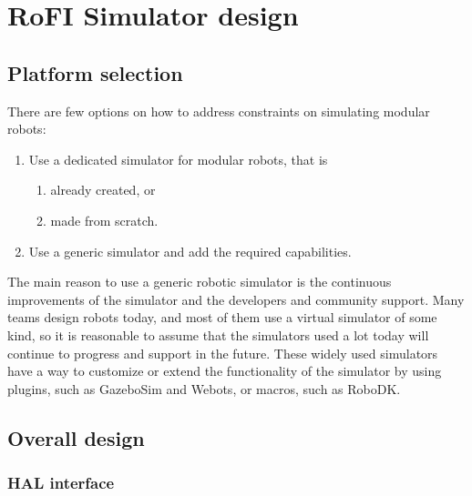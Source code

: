 \documentclass[
  digital, %
  table,   %
  oneside, %
  nolof,     %
  nolot,     %
]{fithesis3}
\begin{document}
\chapter{RoFI Simulator design}

\section{Platform selection}

There are few options on how to address constraints on simulating modular robots:
\begin{enumerate}
    \item Use a dedicated simulator for modular robots, that is
    \begin{enumerate}
        \item already created, or
        \item made from scratch.
    \end{enumerate}
    \item Use a generic simulator and add the required capabilities.
\end{enumerate}

The main reason to use a generic robotic simulator is the continuous improvements of the simulator and the developers and community support.
Many teams design robots today, and most of them use a virtual simulator of some kind, so it is reasonable to assume that the simulators used a lot today will continue to progress and support in the future.
These widely used simulators have a way to customize or extend the functionality of the simulator by using plugins, such as GazeboSim\cite{gazebo} and Webots\cite{webots}, or macros, such as RoboDK\cite{robodk}.


\section{Overall design}



\subsection{HAL interface}
\end{document}
